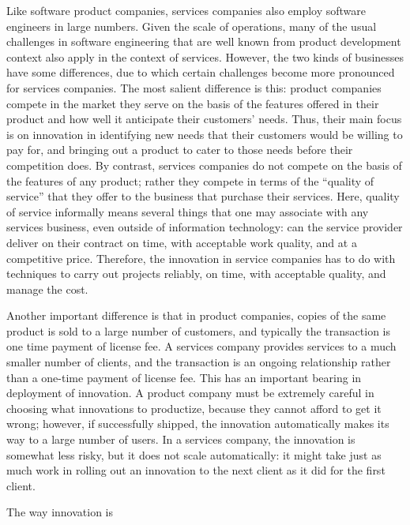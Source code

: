 Like software product companies, services companies also employ software engineers in large numbers. Given the scale of operations, many of the usual challenges in software engineering that are well known from product development context also apply in the context of services.  However, the two kinds of businesses have some differences, due to which certain challenges become more pronounced for services companies. The most salient difference is this: product companies compete in the market they serve on the basis of the features offered in their product and how well it anticipate their customers' needs. Thus, their main focus is on innovation in identifying new needs that their customers would be willing to pay for, and bringing out a product to cater to those needs before their competition does. By contrast, services companies do not compete on the basis of the features of any product; rather they compete in terms of the ``quality of service'' that they offer to the business that purchase their services. Here, quality of service informally means several things that one may associate with any services business, even outside of information technology: can the service provider deliver on their contract on time, with acceptable work quality, and at a competitive price.  Therefore, the innovation in service companies has to do with techniques to carry out projects reliably, on time, with acceptable quality, and manage the cost.

Another important difference is that in product companies, copies of the same product is sold to a large number of customers, and typically the transaction is one time payment of license fee.  A services company provides services to a much smaller number of clients, and the transaction is an ongoing relationship rather than a one-time payment of license fee. This has an important bearing in deployment of innovation.  A product company must be extremely careful in choosing what innovations to productize, because they cannot afford to get it wrong; however, if successfully shipped, the innovation automatically makes its way to a large number of users.  In a services company, the innovation is somewhat less risky, but it does not scale automatically: it might take just as much work in rolling out an innovation to the next client as it did for the first client.

The way innovation is 




\label{sec:intro}
